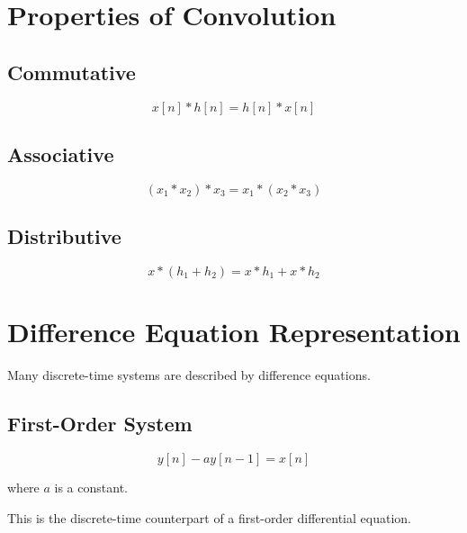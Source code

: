 \section{Properties of Convolution}


\subsection{Commutative}

\[
\boxed{
x[n]*h[n]=h[n]*x[n]
}
\]


\subsection{Associative}

\[
\boxed{
(x_1*x_2)*x_3=x_1*(x_2*x_3)
}
\]


\subsection{Distributive}

\[
\boxed{
x*(h_1+h_2)=x*h_1+x*h_2
}
\]


\section{Difference Equation Representation}

Many discrete-time systems are described by difference equations.


\subsection{First-Order System}

\[
\boxed{
y[n]-ay[n-1]=x[n]
}
\]

where \(a\) is a constant.

This is the discrete-time counterpart of a first-order differential equation.

